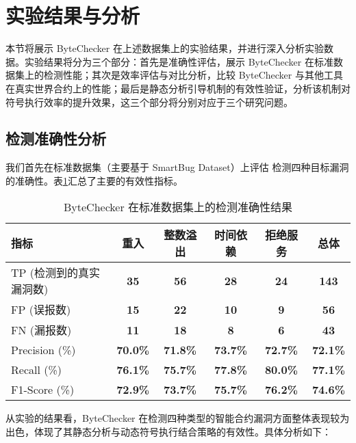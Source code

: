 \documentclass[print, master, vlined, timesmath]{DissertUESTC}
\begin{document}
\section{实验结果与分析}

本节将展示 ByteChecker 在上述数据集上的实验结果，并进行深入分析实验数据。实验结果将分为三个部分：首先是准确性评估，展示 ByteChecker 在标准数据集上的检测性能；其次是效率评估与对比分析，比较 ByteChecker 与其他工具在真实世界合约上的性能；最后是静态分析引导机制的有效性验证，分析该机制对符号执行效率的提升效果，这三个部分将分别对应于三个研究问题。

\subsection{检测准确性分析}

我们首先在标准数据集（主要基于 SmartBug Dataset）上评估  检测四种目标漏洞的准确性。表\ref{tab:accuracy_results_ch5}汇总了主要的有效性指标。

\begin{table}
    \centering
    \caption{ByteChecker 在标准数据集上的检测准确性结果}
    \begin{tabular}{lccccc}
    \toprule
    指标 & 重入 & 整数溢出 & 时间依赖 & 拒绝服务 & \textbf{总体} \\ 
    \midrule
    TP (检测到的真实漏洞数) & \textbf{35} & \textbf{56} & \textbf{28} & \textbf{24} & \textbf{143} \\ 
    FP (误报数) & \textbf{15} & \textbf{22} & \textbf{10} & \textbf{9} & \textbf{56} \\ 
    FN (漏报数) & \textbf{11} & \textbf{18} & \textbf{8} & \textbf{6} & \textbf{43} \\ 
    \midrule
    Precision (\%) & \textbf{70.0\%} & \textbf{71.8\%} & \textbf{73.7\%} & \textbf{72.7\%} & \textbf{72.1\%} \\ 
    Recall  (\%) & \textbf{76.1\%} & \textbf{75.7\%} & \textbf{77.8\%} & \textbf{80.0\%} & \textbf{77.1\%} \\ 
    F1-Score (\%) & \textbf{72.9\%} & \textbf{73.7\%} & \textbf{75.7\%} & \textbf{76.2\%} & \textbf{74.6\%} \\ 
    \bottomrule
    \end{tabular}
    \label{tab:accuracy_results_ch5}
\end{table}

    
从实验的结果看，ByteChecker 在检测四种类型的智能合约漏洞方面整体表现较为出色，体现了其静态分析与动态符号执行结合策略的有效性。具体分析如下：
\end{document}
